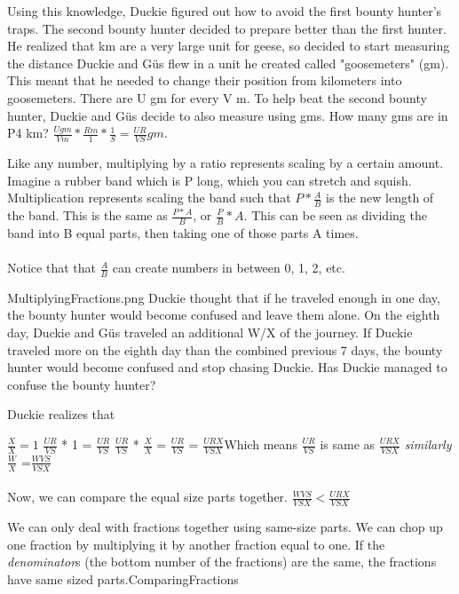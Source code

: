 {Using this knowledge, Duckie figured out how to avoid the first bounty hunter's traps. The second bounty hunter decided to prepare better than the first hunter. He realized that km are a very large unit for geese, so decided to start measuring the distance Duckie and Güs flew in a unit he created called "goosemeters" (gm). This meant that he needed to change their position from kilometers into goosemeters. There are U gm for every V m. To help beat the second bounty hunter, Duckie and Güs decide to also measure using gms. How many gms are in P4 km?}{
$\frac{Ugm}{Vm}*\frac{Rm}{1}*\frac{1}{S}=\frac{UR}{VS} gm$.
}{Like any number, multiplying by a ratio represents scaling by a certain amount. Imagine a rubber band which is P long, which you can stretch and squish. Multiplication represents scaling the band such that $P*\frac{A}{B}$ is the new length of the band. This is the same as $\frac{P*A}{B}$, or $\frac{P}{B}*A$. This can be seen as dividing the band into B equal parts, then taking one of those parts A times. \paragraph{} Notice that that $\frac{A}{B}$ can create numbers in between 0, 1, 2, etc.}{MultiplyingFractions.png}
{Duckie thought that if he traveled enough in one day, the bounty hunter would become confused and leave them alone. On the eighth day, Duckie and Güs traveled an additional W/X of the journey. If Duckie traveled more on the eighth day than the combined previous 7 days, the bounty hunter would become confused and stop chasing Duckie. Has Duckie managed to confuse the bounty hunter?}{Duckie realizes that \begin{center}
    $\frac{X}{X}=1$ \linebreak
    $\frac{UR}{VS}$ * 1 = $\frac{UR}{VS}$ \linebreak
    $\frac{UR}{VS}$ * $\frac{X}{X}$ = $\frac{UR}{VS}$ = $\frac{URX}{VSX}$\linebreak  Which means $\frac{UR}{VS}$  is same as  $\frac{URX}{VSX}$ \linebreak\linebreak
    \textit{similarly}
    $\frac{W}{X}$ =$\frac{WVS}{VSX}$
\end{center}
\paragraph{} Now, we can compare the equal size parts together. $\frac{WVS}{VSX} < \frac{URX}{VSX}$}{We can only deal with fractions together using same-size parts. We can chop up one fraction by multiplying it by another fraction equal to one. If the \textit{denominator}s (the bottom number of the fractions) are the same, the fractions have same sized parts.}{ComparingFractions}
